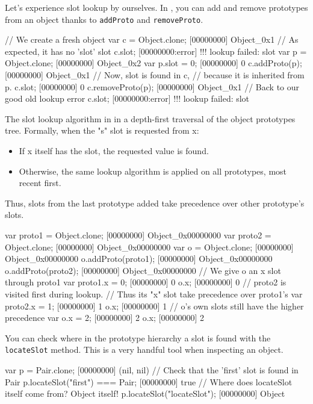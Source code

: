 Let's experience slot lookup by ourselves. In \us, you can add and
remove prototypes from an object thanks to \lstinline{addProto} and
\lstinline{removeProto}.

\begin{urbiscript}
// We create a fresh object
var c = Object.clone;
[00000000] Object_0x1
// As expected, it has no 'slot' slot
c.slot;
[00000000:error] !!! lookup failed: slot
var p = Object.clone;
[00000000] Object_0x2
var p.slot = 0;
[00000000] 0
c.addProto(p);
[00000000] Object_0x1
// Now, slot is found in c,
// because it is inherited from p.
c.slot;
[00000000] 0
c.removeProto(p);
[00000000] Object_0x1
// Back to our good old lookup error
c.slot;
[00000000:error] !!! lookup failed: slot
\end{urbiscript}

The slot lookup algorithm in \us in a depth-first traversal of the
object prototypes tree. Formally, when the "s" slot is requested from
x:

\begin{itemize}
\item If x itself has the slot, the requested value is found.
\item Otherwise, the same lookup algorithm is applied on all
  prototypes, most recent first.
\end{itemize}

Thus, slots from the last prototype added take precedence over other
prototype's slots.

\begin{urbiscript}
var proto1 = Object.clone;
[00000000] Object_0x00000000
var proto2 = Object.clone;
[00000000] Object_0x00000000
var o = Object.clone;
[00000000] Object_0x00000000
o.addProto(proto1);
[00000000] Object_0x00000000
o.addProto(proto2);
[00000000] Object_0x00000000
// We give o an x slot through proto1
var proto1.x = 0;
[00000000] 0
o.x;
[00000000] 0
// proto2 is visited first during lookup.
// Thus its "x" slot take precedence over proto1's
var proto2.x = 1;
[00000000] 1
o.x;
[00000000] 1
// o's own slots still have the higher precedence
var o.x = 2;
[00000000] 2
o.x;
[00000000] 2
\end{urbiscript}

You can check where in the prototype hierarchy a slot is found with
the \lstinline{locateSlot} method. This is a very
handful tool when inspecting an object.

\begin{urbiscript}
var p = Pair.clone;
[00000000] (nil, nil)
// Check that the 'first' slot is found in Pair
p.locateSlot("first") === Pair;
[00000000] true
// Where does locateSlot itself come from? Object itself!
p.locateSlot("locateSlot");
[00000000] Object
\end{urbiscript}

